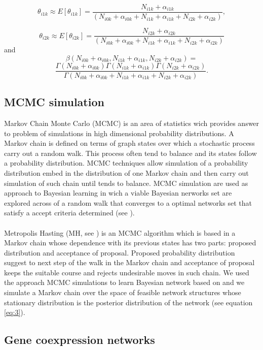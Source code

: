 \documentclass{bmcart}
\begin{document}
\[
\theta_{i1k}\approx E[\theta_{i1k}]=\frac{N_{i1k}+\alpha_{i1k}}{(N_{i0k}+\alpha_{i0k}+N_{i1k}+\alpha_{i1k}+N_{i2k}+\alpha_{i2k})},
\]
 
\[
\theta_{i2k}\approx E[\theta_{i2k}]=\frac{N_{i2k}+\alpha_{i2k}}{(N_{i0k}+\alpha_{i0k}+N_{i1k}+\alpha_{i1k}+N_{i2k}+\alpha_{i2k})}
\]
 and 
\[
\beta(N_{i0k}+\alpha_{i0k},N_{i1k}+\alpha_{i1k},N_{i2k}+\alpha_{i2k})=
\]
\[
\frac{\Gamma(N_{i0k}+\alpha_{i0k})\Gamma(N_{i1k}+\alpha_{i1k})\Gamma(N_{i2k}+\alpha_{i2k})}{\Gamma(N_{i0k}+\alpha_{i0k}+N_{i1k}+\alpha_{i1k}+N_{i2k}+\alpha_{i2k})}.
\]

\subsection*{MCMC simulation}

Markov Chain Monte Carlo (MCMC) is an area of statistics wich provides answer to problem of simulations in high dimensional probability distributions. A Markov chain is defined on terms of graph states over which a stochastic process carry out a random walk. This process often tend to balance and its states follow a probability distribution. MCMC techniques allow simulation of a probability distribution embed in the distribution of one Markov chain and then carry out simulation of such chain until tends to balance. MCMC simulation are used as approach to Bayesian learning in wich a viable Bayesian nerworks set are explored across of a random walk that converges to a optimal networks set that satisfy a accept criteria determined (see \cite{Friedman2003Bayesian,korb2010bayesian,Murphy2012,madigan1994model,madigan1995bayesian,Giudici01121999}).
\\
\\
Metropolis Hasting (MH, see \cite{HASTINGS01041970}) is an MCMC algorithm which is based in a Markov chain whose dependence with its previous states has two parts: proposed distribution and acceptance of proposal. Proposed probability distribution suggest to next step of the walk in the Markov chain and acceptance of proposal keeps the suitable course and rejects undesirable moves in such chain. We used the approach MCMC simulations to learn Bayesian network based on \cite{KollerFriedman09} and we simulate a Markov chain over the space of feasible network structures whose stationary distribution is the posterior distribution of the network (see equation \ref{eq:3}).

\subsection*{Gene coexpression networks}
\end{document}
